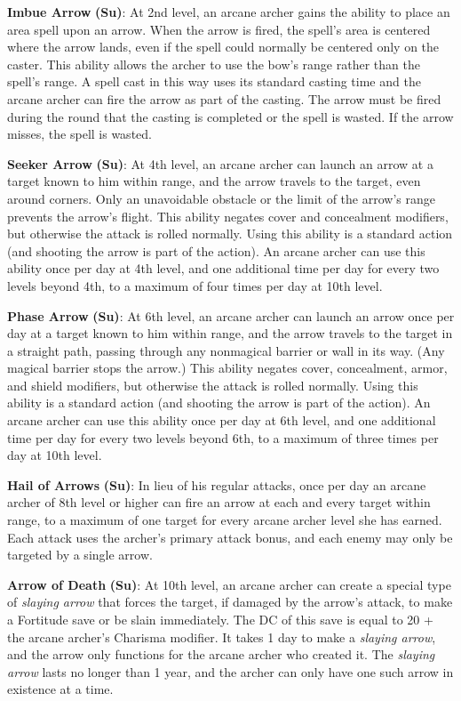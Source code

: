 \textbf{Imbue Arrow} \textbf{(Su)}: At 2nd level, an arcane archer gains the ability to place an area spell upon an arrow. When the arrow is fired, the spell's area is centered where the arrow lands, even if the spell could normally be centered only on the caster. This ability allows the archer to use the bow's range rather than the spell's range. A spell cast in this way uses its standard casting time and the arcane archer can fire the arrow as part of the casting. The arrow must be fired during the round that the casting is completed or the spell is wasted. If the arrow misses, the spell is wasted.
				
\textbf{Seeker Arrow} \textbf{(Su)}: At 4th level, an arcane archer can launch an arrow at a target known to him within range, and the arrow travels to the target, even around corners. Only an unavoidable obstacle or the limit of the arrow's range prevents the arrow's flight. This ability negates cover and concealment modifiers, but otherwise the attack is rolled normally. Using this ability is a standard action (and shooting the arrow is part of the action). An arcane archer can use this ability once per day at 4th level, and one additional time per day for every two levels beyond 4th, to a maximum of four times per day at 10th level.
				
\textbf{Phase Arrow} \textbf{(Su)}: At 6th level, an arcane archer can launch an arrow once per day at a target known to him within range, and the arrow travels to the target in a straight path, passing through any nonmagical barrier or wall in its way. (Any magical barrier stops the arrow.) This ability negates cover, concealment, armor, and shield modifiers, but otherwise the attack is rolled normally. Using this ability is a standard action (and shooting the arrow is part of the action). An arcane archer can use this ability once per day at 6th level, and one additional time per day for every two levels beyond 6th, to a maximum of three times per day at 10th level.
				
\textbf{Hail of Arrows} \textbf{(Su)}: In lieu of his regular attacks, once per day an arcane archer of 8th level or higher can fire an arrow at each and every target within range, to a maximum of one target for every arcane archer level she has earned. Each attack uses the archer's primary attack bonus, and each enemy may only be targeted by a single arrow.
				
\textbf{Arrow of Death} \textbf{(Su)}: At 10th level, an arcane archer can create a special type of\textit{ slaying arrow }that forces the target, if damaged by the arrow's attack, to make a Fortitude save or be slain immediately. The DC of this save is equal to 20 + the arcane archer's Charisma modifier. It takes 1 day to make a \textit{slaying arrow}, and the arrow only functions for the arcane archer who created it. The \textit{slaying arrow }lasts no longer than 1 year, and the archer can only have one such arrow in existence at a time.
        	
